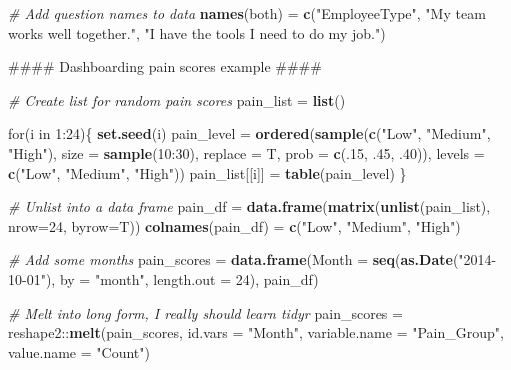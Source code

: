 \documentclass[]{book}
\newenvironment{Shaded}{\begin{snugshade}}{\end{snugshade}}
\newcommand{\KeywordTok}[1]{\textcolor[rgb]{0.13,0.29,0.53}{\textbf{{#1}}}}
\newcommand{\DataTypeTok}[1]{\textcolor[rgb]{0.13,0.29,0.53}{{#1}}}
\newcommand{\DecValTok}[1]{\textcolor[rgb]{0.00,0.00,0.81}{{#1}}}
\newcommand{\StringTok}[1]{\textcolor[rgb]{0.31,0.60,0.02}{{#1}}}
\newcommand{\CommentTok}[1]{\textcolor[rgb]{0.56,0.35,0.01}{\textit{{#1}}}}
\newcommand{\NormalTok}[1]{{#1}}
\begin{document}
\begin{Shaded}
\begin{Highlighting}[]
\CommentTok{# Add question names to data}
\KeywordTok{names}\NormalTok{(both) =}\StringTok{ }\KeywordTok{c}\NormalTok{(}\StringTok{"EmployeeType"}\NormalTok{, }
                \StringTok{"My team works well together."}\NormalTok{, }
                \StringTok{"I have the tools I need to do my job."}\NormalTok{)}

\NormalTok{#### Dashboarding pain scores example ####}

\CommentTok{# Create list for random pain scores}
\NormalTok{pain_list =}\StringTok{ }\KeywordTok{list}\NormalTok{()}

\NormalTok{for(i in }\DecValTok{1}\NormalTok{:}\DecValTok{24}\NormalTok{)\{}
  \KeywordTok{set.seed}\NormalTok{(i)}
  \NormalTok{pain_level =}\StringTok{ }\KeywordTok{ordered}\NormalTok{(}\KeywordTok{sample}\NormalTok{(}\KeywordTok{c}\NormalTok{(}\StringTok{"Low"}\NormalTok{, }\StringTok{"Medium"}\NormalTok{, }\StringTok{"High"}\NormalTok{), }\DataTypeTok{size =} \KeywordTok{sample}\NormalTok{(}\DecValTok{10}\NormalTok{:}\DecValTok{30}\NormalTok{),}
    \DataTypeTok{replace =} \NormalTok{T, }\DataTypeTok{prob =} \KeywordTok{c}\NormalTok{(.}\DecValTok{15}\NormalTok{, .}\DecValTok{45}\NormalTok{, .}\DecValTok{40}\NormalTok{)), }\DataTypeTok{levels =} \KeywordTok{c}\NormalTok{(}\StringTok{"Low"}\NormalTok{, }\StringTok{"Medium"}\NormalTok{, }\StringTok{"High"}\NormalTok{))}
  \NormalTok{pain_list[[i]] =}\StringTok{ }\KeywordTok{table}\NormalTok{(pain_level)}
\NormalTok{\}}

\CommentTok{# Unlist into a data frame}
\NormalTok{pain_df =}\StringTok{ }\KeywordTok{data.frame}\NormalTok{(}\KeywordTok{matrix}\NormalTok{(}\KeywordTok{unlist}\NormalTok{(pain_list), }\DataTypeTok{nrow=}\DecValTok{24}\NormalTok{, }\DataTypeTok{byrow=}\NormalTok{T))}
\KeywordTok{colnames}\NormalTok{(pain_df) =}\StringTok{ }\KeywordTok{c}\NormalTok{(}\StringTok{"Low"}\NormalTok{, }\StringTok{"Medium"}\NormalTok{, }\StringTok{"High"}\NormalTok{)}

\CommentTok{# Add some months}
\NormalTok{pain_scores =}\StringTok{ }\KeywordTok{data.frame}\NormalTok{(}\DataTypeTok{Month =} \KeywordTok{seq}\NormalTok{(}\KeywordTok{as.Date}\NormalTok{(}\StringTok{"2014-10-01"}\NormalTok{), }\DataTypeTok{by =} \StringTok{"month"}\NormalTok{, }
  \DataTypeTok{length.out =} \DecValTok{24}\NormalTok{), pain_df)}

\CommentTok{# Melt into long form, I really should learn tidyr}
\NormalTok{pain_scores =}\StringTok{ }\NormalTok{reshape2::}\KeywordTok{melt}\NormalTok{(pain_scores, }\DataTypeTok{id.vars =} \StringTok{"Month"}\NormalTok{, }
  \DataTypeTok{variable.name =} \StringTok{"Pain_Group"}\NormalTok{, }\DataTypeTok{value.name =} \StringTok{"Count"}\NormalTok{)}


\end{Highlighting}
\end{Shaded}
\end{document}
